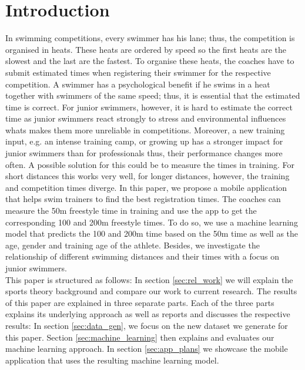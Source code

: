 \section{Introduction}


In swimming competitions, every swimmer has his lane; thus, the competition is organised in heats. These heats are ordered by speed so the first heats are the slowest and the last are the fastest. To organise these heats, the coaches have to submit estimated times when registering their swimmer for the respective competition. A swimmer has a psychological benefit if he swims in a heat together with swimmers of the same speed; thus, it is essential that the estimated time is correct. For junior swimmers, however, it is hard to estimate the correct time as junior swimmers react strongly to stress and environmental influences\cite{mccarthy2013emotions} whats makes them more unreliable in competitions. Moreover, a new training input, e.g. an intense training camp, or growing up has a stronger impact for junior swimmers than for professionals thus, their performance changes more often. A possible solution for this could be to measure the times in training. For short distances this works very well, for longer distances, however, the training and competition times diverge. In this paper, we propose a mobile application that helps swim trainers to find the best registration times. The coaches can measure the 50m freestyle time in training and use the app to get the corresponding 100 and 200m freestyle times. To do so, we use a machine learning model that predicts the 100 and 200m time based on the 50m time as well as the age, gender and training age of the athlete. Besides, we investigate the relationship of different swimming distances and their times with a focus on junior swimmers.\\
This paper is structured as follows: In section \ref{sec:rel_work} we will explain the sports theory background and compare our work to current research. The results of this paper are explained in three separate parts. Each of the three parts explains its underlying approach as well as reports and discusses the respective results: In section \ref{sec:data_gen}, we focus on the new dataset we generate for this paper. Section \ref{sec:machine_learning} then explains and evaluates our machine learning approach. In section \ref{sec:app_plans} we  showcase the mobile application that uses the resulting machine learning model.